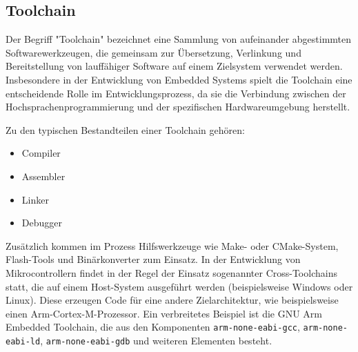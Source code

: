 \subsection*{Toolchain}
Der Begriff "Toolchain" bezeichnet eine Sammlung von aufeinander abgestimmten Softwarewerkzeugen, die gemeinsam zur Übersetzung, Verlinkung und Bereitstellung von lauffähiger Software auf einem Zielsystem verwendet werden. 
Insbesondere in der Entwicklung von Embedded Systems spielt die Toolchain eine entscheidende Rolle im Entwicklungsprozess, da sie die Verbindung zwischen der Hochsprachenprogrammierung und der spezifischen Hardwareumgebung herstellt.

Zu den typischen Bestandteilen einer Toolchain gehören:
\begin{itemize}
	\item Compiler
	\item Assembler
	\item Linker
	\item Debugger
\end{itemize}

Zusätzlich kommen im Prozess Hilfswerkzeuge wie Make- oder CMake-System, Flash-Tools und Binärkonverter zum Einsatz.
In der Entwicklung von Mikrocontrollern findet in der Regel der Einsatz sogenannter Cross-Toolchains statt, die auf einem Host-System ausgeführt werden (beispielsweise Windows oder Linux). 
Diese erzeugen Code für eine andere Zielarchitektur, wie beispielsweise einen Arm-Cortex-M-Prozessor. 
Ein verbreitetes Beispiel ist die GNU Arm Embedded Toolchain, die aus den Komponenten \texttt{arm-none-eabi-gcc}, \texttt{arm-none-eabi-ld}, \texttt{arm-none-eabi-gdb} und weiteren Elementen besteht.

%



